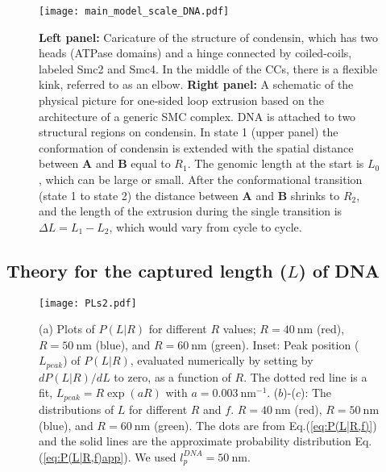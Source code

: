 \documentclass[fleqn,10pt]{wlscirep}
\newcommand{\nm}{\ \mathrm{nm}}
\newcommand{\persec}{\ \mathrm{s}^{-1}}
\newcommand{\vR}{R}
\newcommand{\vL}{L}
\newcommand{\Dl}{\Delta {L}}
\begin{document}

\begin{figure}[]
\centering
\texttt{[image: main\_model\_scale\_DNA.pdf]}
\caption{\label{fig:modelfig} {\bf Left panel:} Caricature of the structure of condensin, which has two heads (ATPase domains) and a hinge connected by coiled-coils, labeled Smc2 and Smc4. In the middle of the CCs, there is a flexible kink, referred to as an elbow. {\bf Right panel:} A schematic of the physical picture for one-sided loop extrusion based on the architecture of a generic SMC complex. DNA is attached to two structural regions on condensin. In state 1 (upper panel) the conformation of condensin is extended with the spatial distance between {\bf A} and {\bf B} equal to  $R_1$. The genomic length at the  start is $L_0$, which can be large or small.  After the conformational transition (state 1 to state 2) the distance between {\bf A} and {\bf B} shrinks to  $R_2$, and the length of the extrusion during the single transition is $\Dl =L_1 - L_2$, which would vary from cycle to cycle. }
\end{figure}

\subsection*{Theory for the captured length ($\vL$) of DNA}
\begin{figure}[]
\centering
\texttt{[image: PLs2.pdf]}
\caption{\label{fig:PLFdist} (a) Plots of $P(\vL|\vR)$ for different $\vR$ values; $\vR=40\nm$ (red), $\vR=50\nm$ (blue), and $\vR=60\nm$ (green). Inset: Peak position ($\vL_{peak}$) of $P(\vL|\vR)$, evaluated numerically by setting by $dP(\vL|\vR)/d\vL$ to zero, as a function of $\vR$. The dotted red line is a fit, $\vL_{peak}=\vR\exp(a\vR)$ with $a=0.003\ \mathrm{nm}^{-1}$.   
($b$)-($c$): The distributions of $L$ for different $\vR$ and $f$. $\vR=40\nm$ (red), $\vR=50\nm$ (blue), and $\vR=60\nm$ (green). The dots are from Eq.(\ref{eq:P(L|R,f)}) and the solid lines are the approximate probability distribution Eq.(\ref{eq:P(L|R,f)app}).  We used $l^{DNA}_p=50\nm$.
}
\end{figure}
\end{document}
